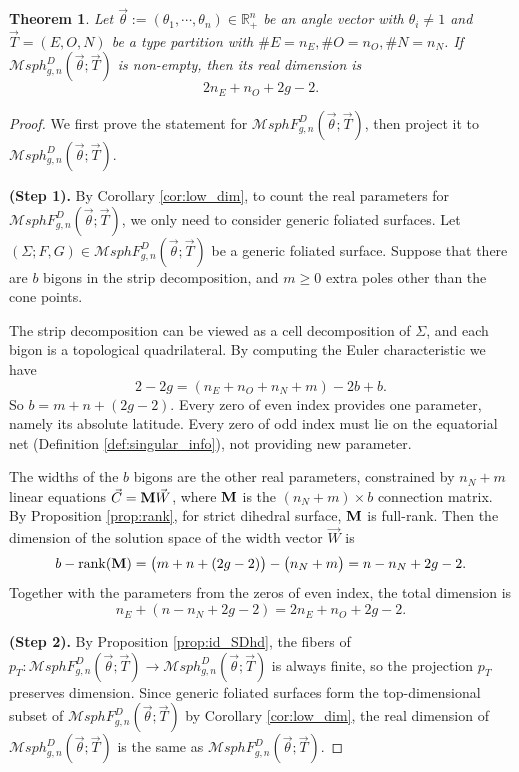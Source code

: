 \documentclass[pdflatex,sn-mathphys]{sn-jnl}%
\numberwithin{equation}{section}
\theoremstyle{thmstyleone}%
\newtheorem{theorem}{Theorem}[section]%
\newcommand{\RR}{\mathbb{R}}
\newcommand{\MsphgnDT}{\mathcal{M}sph_{g,n}^D(\vec{\theta};\vec{T})}
\newcommand{\MsphgnDFT}{\mathcal{M}sphF_{g,n}^D(\vec{\theta};\vec{T})}
\newcommand{\PH}{Poincar\'{e}-Hopf}
\begin{document}
\begin{theorem}\label{thm:dim_count_DT}
    Let $\vec{\theta}:=(\theta_1, \cdots, \theta_n) \in \RR^n_+$ be an angle vector with $\theta_i\neq1$ and $\vec{T}=( E, O, N )$ be a type partition with $ \#E=n_E, \#O=n_O, \#N=n_N $.
    If $\MsphgnDT$ is non-empty, then its real dimension is 
    $$ 2n_E+n_O+2g-2. $$
\end{theorem}
\begin{proof}
    We first prove the statement for $\MsphgnDFT$, then project it to $\MsphgnDT$.

    \textbf{(Step 1).} By Corollary \ref{cor:low_dim}, to count the real parameters for $\MsphgnDFT$, we only need to consider generic foliated surfaces. 
    Let $(\Sigma;F,G)\in \MsphgnDFT$ be a generic foliated surface. Suppose that there are $b$ bigons in the strip decomposition, and $m\geq0$ extra poles other than the cone points.


    The strip decomposition can be viewed as a cell decomposition of $\Sigma$, and each bigon is a topological quadrilateral. By computing the Euler characteristic we have
    \[ 2-2g = (n_E + n_O + n_N + m) - 2b + b. \]
    So $b = m+n+(2g-2) $. 
    Every zero of even index provides one parameter, namely its absolute latitude. Every zero of odd index must lie on the equatorial net (Definition \ref{def:singular_info}), not providing new parameter.

    The widths of the $b$ bigons are the other real parameters, constrained by $n_N+m$ linear equations $\vec{C}=\mathbf{M} \vec{W}$, where $\mathbf{M}$ is the $(n_N+m)\times b$ connection matrix. By Proposition \ref{prop:rank}, for strict dihedral surface, $\mathbf{M}$ is full-rank. Then the dimension of the solution space of the width vector $\vec{W}$ is
    \[ b - \mathrm{rank}(\mathbf{M}) = \big(m+n+(2g-2)\big) - \big( n_N+m \big) = n - n_N + 2g-2. \]
    Together with the parameters from the zeros of even index, the total dimension is
    \[ n_E + (n - n_N + 2g-2) = 2 n_E + n_O + 2g-2. \]

    \textbf{(Step 2).} By Proposition \ref{prop:id_SDhd}, the fibers of $p_T:\MsphgnDFT \to \MsphgnDT$ is always finite, so the projection $p_T$ preserves dimension. Since generic foliated surfaces form the top-dimensional subset of $\MsphgnDFT$ by Corollary \ref{cor:low_dim}, the real dimension of $\MsphgnDT$ is the same as $\MsphgnDFT$.    
\end{proof}
\end{document}
